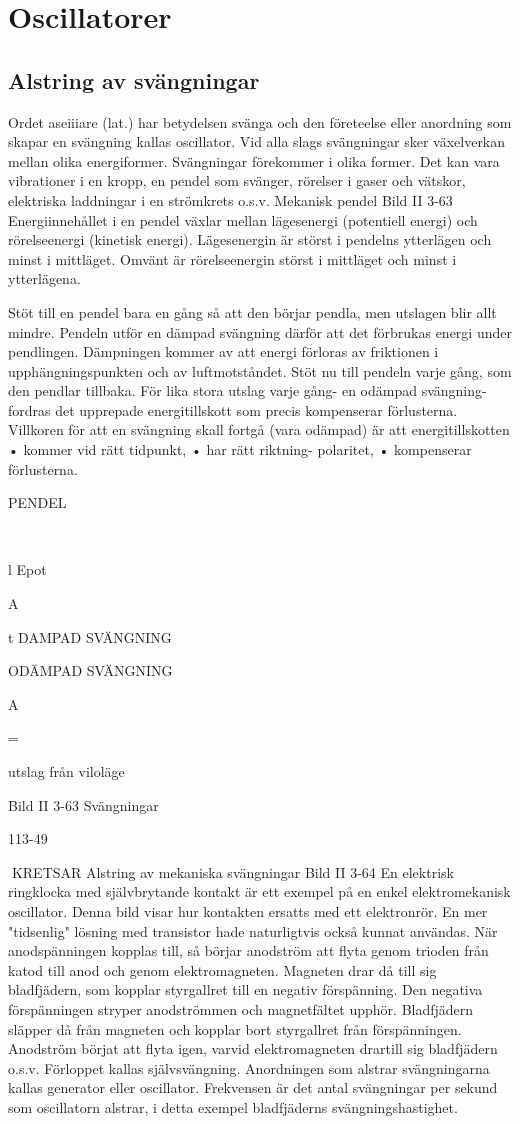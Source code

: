 \section{Oscillatorer}

\subsection{Alstring av svängningar}
Ordet aseiiiare (lat.) har betydelsen svänga
och den företeelse eller anordning som skapar en svängning kallas oscillator. Vid alla
slags svängningar sker växelverkan mellan
olika energiformer. Svängningar förekommer i olika former. Det kan vara vibrationer i
en kropp, en pendel som svänger, rörelser i
gaser och vätskor, elektriska laddningar i en
strömkrets o.s.v.
Mekanisk pendel
Bild II 3-63
Energiinnehållet i en pendel växlar mellan
lägesenergi (potentiell energi) och rörelseenergi (kinetisk energi). Lägesenergin är
störst i pendelns ytterlägen och minst i mittläget. Omvänt är rörelseenergin störst i mittläget och minst i ytterlägena.

Stöt till en pendel bara en gång så att den
börjar pendla, men utslagen blir allt mindre.
Pendeln utför en dämpad svängning därför
att det förbrukas energi under pendlingen.
Dämpningen kommer av att energi förloras av friktionen i upphängningspunkten och
av luftmotståndet.
Stöt nu till pendeln varje gång, som den
pendlar tillbaka. För lika stora utslag varje
gång- en odämpad svängning- fordras det
upprepade energitillskott som precis kompenserar förlusterna.
Villkoren för att en svängning skall fortgå
(vara odämpad) är att energitillskotten
• kommer vid rätt tidpunkt,
• har rätt riktning- polaritet,
• kompenserar förlusterna.

PENDEL

\

l
Epot

A

t
DAMPAD SVÄNGNING

ODÄMPAD SVÄNGNING

A

=

utslag från viloläge

Bild II 3-63 Svängningar

113-49

KRETSAR
Alstring av mekaniska svängningar
Bild II 3-64
En elektrisk ringklocka med självbrytande
kontakt är ett exempel på en enkel elektromekanisk oscillator. Denna bild visar hur
kontakten ersatts med ett elektronrör. En
mer "tidsenlig" lösning med transistor hade
naturligtvis också kunnat användas.
När anodspänningen kopplas till, så börjar anodström att flyta genom trioden från
katod till anod och genom elektromagneten.
Magneten drar då till sig bladfjädern, som
kopplar styrgallret till en negativ förspänning.
Den negativa förspänningen stryper anodströmmen och magnetfältet upphör. Bladfjädern släpper då från magneten och kopplar
bort styrgallret från förspänningen. Anodström börjat att flyta igen, varvid elektromagneten drartill sig bladfjädern o.s.v. Förloppet
kallas självsvängning.
Anordningen som alstrar svängningarna
kallas generator eller oscillator. Frekvensen
är det antal svängningar per sekund som
oscillatorn alstrar, i detta exempel bladfjäderns svängningshastighet.

